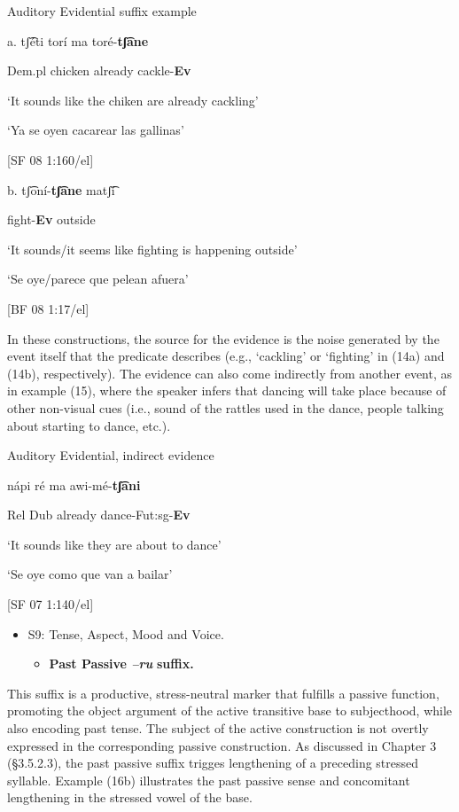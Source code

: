   Auditory Evidential suffix example

a.   tʃ͡éti     torí     ma     toré-\textbf{tʃ͡ane}

Dem.pl    chicken  already    cackle-\textbf{Ev}   

‘It sounds like the chiken are already cackling’

‘Ya se oyen cacarear las gallinas’      

[SF 08 1:160/el]

  b.  tʃ͡oní-\textbf{tʃ͡ane}  matʃ͡í

    fight-\textbf{Ev}  outside

    ‘It sounds/it seems like fighting is happening outside’

    ‘Se oye/parece que pelean afuera’      

    [BF 08 1:17/el]

  In these constructions, the source for the evidence is the noise generated by the event itself that the predicate describes (e.g., ‘cackling’ or ‘fighting’ in (14a) and (14b), respectively). The evidence can also come indirectly from another event, as in example (15), where the speaker infers that dancing will take place because of other non-visual cues (i.e., sound of the rattles used in the dance, people talking about starting to dance, etc.). 

    Auditory Evidential, indirect evidence

  nápi   ré  ma    awi-mé-\textbf{tʃ͡ani}

Rel  Dub  already    dance-Fut:sg-\textbf{Ev}

‘It sounds like they are about to dance’

‘Se oye como que van a bailar’      

[SF 07 1:140/el]

\begin{itemize}
\item 
S9: Tense, Aspect, Mood and Voice.


\begin{itemize}
\item \textbf{Past Passive \textit{–ru} }\textbf{suffix.}
\end{itemize}
\end{itemize}

This suffix is a productive, stress-neutral marker that fulfills a passive function, promoting the object argument of the active transitive base to subjecthood, while also encoding past tense. The subject of the active construction is not overtly expressed in the corresponding passive construction. As discussed in Chapter 3 (§3.5.2.3), the past passive suffix trigges lengthening of a preceding stressed syllable. Example (16b) illustrates the past passive sense and concomitant lengthening in the stressed vowel of the base.

